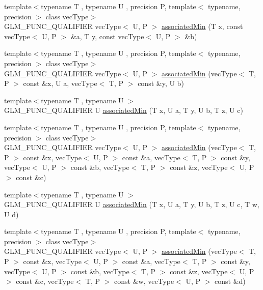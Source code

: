 \begin{DoxyCompactItemize}
\item 
{\footnotesize template$<$typename T , typename U , precision P, template$<$ typename, precision $>$ class vec\+Type$>$ }\\G\+L\+M\+\_\+\+F\+U\+N\+C\+\_\+\+Q\+U\+A\+L\+I\+F\+I\+E\+R vec\+Type$<$ U, P $>$ \hyperlink{group__gtx__associated__min__max_ga1dccff48fa5650c746533de83467da6e}{associated\+Min} (T x, const vec\+Type$<$ U, P $>$ \&a, T y, const vec\+Type$<$ U, P $>$ \&b)
\item 
{\footnotesize template$<$typename T , typename U , precision P, template$<$ typename, precision $>$ class vec\+Type$>$ }\\G\+L\+M\+\_\+\+F\+U\+N\+C\+\_\+\+Q\+U\+A\+L\+I\+F\+I\+E\+R vec\+Type$<$ U, P $>$ \hyperlink{group__gtx__associated__min__max_ga076717f4e07c6ae725cc1382d1ac4869}{associated\+Min} (vec\+Type$<$ T, P $>$ const \&x, U a, vec\+Type$<$ T, P $>$ const \&y, U b)
\item 
{\footnotesize template$<$typename T , typename U $>$ }\\G\+L\+M\+\_\+\+F\+U\+N\+C\+\_\+\+Q\+U\+A\+L\+I\+F\+I\+E\+R U \hyperlink{group__gtx__associated__min__max_gad0aa8f86259a26d839d34a3577a923fc}{associated\+Min} (T x, U a, T y, U b, T z, U c)
\item 
{\footnotesize template$<$typename T , typename U , precision P, template$<$ typename, precision $>$ class vec\+Type$>$ }\\G\+L\+M\+\_\+\+F\+U\+N\+C\+\_\+\+Q\+U\+A\+L\+I\+F\+I\+E\+R vec\+Type$<$ U, P $>$ \hyperlink{group__gtx__associated__min__max_ga5bc6b9acbf9e060d58a342fbe3b73d43}{associated\+Min} (vec\+Type$<$ T, P $>$ const \&x, vec\+Type$<$ U, P $>$ const \&a, vec\+Type$<$ T, P $>$ const \&y, vec\+Type$<$ U, P $>$ const \&b, vec\+Type$<$ T, P $>$ const \&z, vec\+Type$<$ U, P $>$ const \&c)
\item 
{\footnotesize template$<$typename T , typename U $>$ }\\G\+L\+M\+\_\+\+F\+U\+N\+C\+\_\+\+Q\+U\+A\+L\+I\+F\+I\+E\+R U \hyperlink{group__gtx__associated__min__max_ga432224ebe2085eaa2b63a077ecbbbff6}{associated\+Min} (T x, U a, T y, U b, T z, U c, T w, U d)
\item 
{\footnotesize template$<$typename T , typename U , precision P, template$<$ typename, precision $>$ class vec\+Type$>$ }\\G\+L\+M\+\_\+\+F\+U\+N\+C\+\_\+\+Q\+U\+A\+L\+I\+F\+I\+E\+R vec\+Type$<$ U, P $>$ \hyperlink{group__gtx__associated__min__max_ga88e031f22b80215505928900d3dde549}{associated\+Min} (vec\+Type$<$ T, P $>$ const \&x, vec\+Type$<$ U, P $>$ const \&a, vec\+Type$<$ T, P $>$ const \&y, vec\+Type$<$ U, P $>$ const \&b, vec\+Type$<$ T, P $>$ const \&z, vec\+Type$<$ U, P $>$ const \&c, vec\+Type$<$ T, P $>$ const \&w, vec\+Type$<$ U, P $>$ const \&d)

\end{DoxyCompactItemize}
